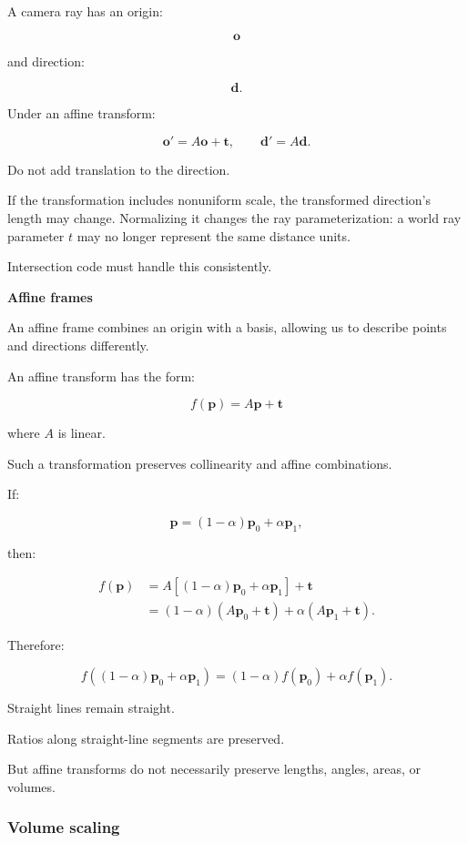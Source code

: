 A camera ray has an origin:

\[
 \mathbf o
\]

and direction:

\[
 \mathbf d.
\]

Under an affine transform:

\[
 \boxed{ \mathbf o'=A\mathbf o+\mathbf t, \qquad \mathbf d'=A\mathbf d }.
\]

Do not add translation to the direction.

If the transformation includes nonuniform scale, the transformed direction's length may change. Normalizing it changes the ray parameterization: a world ray parameter \(t\) may no longer represent the same distance units.

Intersection code must handle this consistently.

\textbf{Affine frames}

An affine frame combines an origin with a basis, allowing us to describe points and directions differently.

An affine transform has the form:

\[
 \boxed{ f(\mathbf p)=A\mathbf p+\mathbf t }
\]

where \(A\) is linear.

Such a transformation preserves collinearity and affine combinations.

If:

\[
 \mathbf p=(1-\alpha)\mathbf p_0+\alpha\mathbf p_1,
\]

then:

\[
 \begin{aligned} f(\mathbf p) &= A[(1-\alpha)\mathbf p_0+\alpha\mathbf p_1]+\mathbf t\\ &=(1-\alpha)(A\mathbf p_0+\mathbf t) +\alpha(A\mathbf p_1+\mathbf t). \end{aligned}
\]

Therefore:

\[
 \boxed{ f((1-\alpha)\mathbf p_0+\alpha\mathbf p_1) = (1-\alpha)f(\mathbf p_0)+\alpha f(\mathbf p_1) }.
\]

Straight lines remain straight.

Ratios along straight-line segments are preserved.

But affine transforms do not necessarily preserve lengths, angles, areas, or volumes.

\subsubsection{Volume scaling}\label{02-foundations-ii-ch032-volume-scaling}

